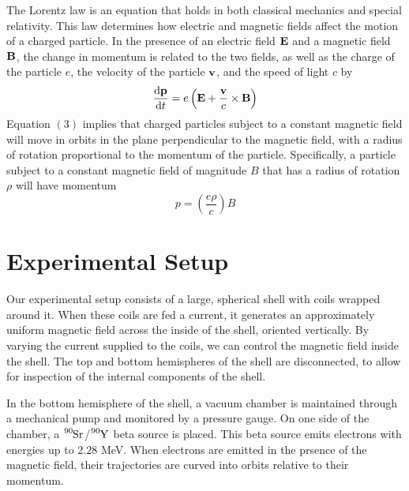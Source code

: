 The Lorentz law is an equation that holds in both classical mechanics and special relativity. This law determines how electric and magnetic fields affect the motion of a charged particle. In the presence of an electric field $\vb{E}$ and a magnetic field $\vb{B}$, the change in momentum is related to the two fields, as well as the charge of the particle $e$, the velocity of the particle $\vb{v}$, and the speed of light $c$ by
\begin{equation}
    \dv{\vb{p}}{t} = e\left(\vb{E} + \frac{\vb{v}}{c} \times \vb{B} \right)
  \end{equation}
  Equation $(3)$ implies that charged particles subject to a constant magnetic field will move in orbits in the plane perpendicular to the magnetic field, with a radius of rotation proportional to the momentum of the particle. Specifically, a particle subject to a constant magnetic field of magnitude $B$ that has a radius of rotation $\rho$ will have momentum 
  \begin{equation}
    p = \left(\frac{e\rho}{c}\right) B
  \end{equation}

\section{Experimental Setup}
Our experimental setup consists of a large, spherical shell with coils wrapped around it. When these coils are fed a current, it generates an approximately uniform magnetic field across the inside of the shell, oriented vertically. By varying the current supplied to the coils, we can control the magnetic field inside the shell. The top and bottom hemispheres of the shell are disconnected, to allow for inspection of the internal components of the shell.

In the bottom hemisphere of the shell, a vacuum chamber is maintained through a mechanical pump and monitored by a pressure gauge. On one side of the chamber, a $\tensor*[^{90}]{\text{Sr}}{}$/$\tensor*[^{90}]{\text{Y}}{}$ beta source is placed. This beta source emits electrons with energies up to $2.28$ MeV. When electrons are emitted in the prsence of the magnetic field, their trajectories are curved into orbits relative to their momentum.

